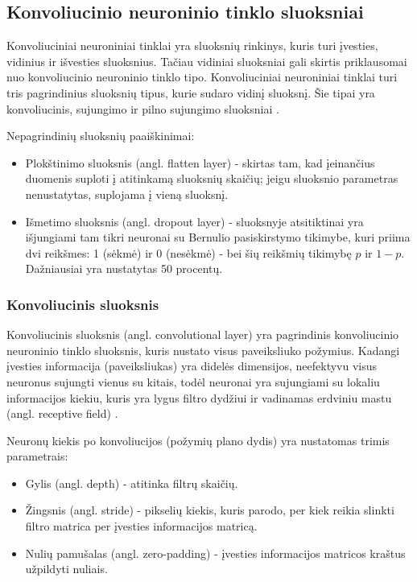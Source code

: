 \documentclass{VUMIFPSbakalaurinis}
\begin{document}
\subsection{Konvoliucinio neuroninio tinklo sluoksniai}
Konvoliuciniai neuroniniai tinklai yra sluoksnių rinkinys, kuris turi įvesties, vidinius ir išvesties sluoksnius. Tačiau vidiniai sluoksniai gali skirtis priklausomai 
nuo konvoliucinio neuroninio tinklo tipo. Konvoliuciniai neuroniniai tinklai turi tris pagrindinius 
sluoksnių tipus, kurie sudaro vidinį sluoksnį. Šie tipai yra konvoliucinis, sujungimo ir pilno sujungimo sluoksniai \cite{CNNbasic}.

Nepagrindinių sluoksnių paaiškinimai:
\begin{itemize}
\item Plokštinimo sluoksnis (angl. flatten layer) - skirtas tam, kad įeinančius duomenis suploti į atitinkamą sluoksnių skaičių; jeigu sluoksnio parametras nenustatytas, suplojama į vieną sluoksnį.
\item Išmetimo sluoksnis (angl. dropout layer) - sluoksnyje atsitiktinai yra išjungiami tam tikri neuronai su Bernulio pasiskirstymo tikimybe, kuri priima dvi reikšmes: 1 (sėkmė) ir 0 (nesėkmė) - 
bei šių reikšmių tikimybę \(p\) ir \(1 - p\). Dažniausiai yra nustatytas 50 procentų.
\end{itemize}

\subsubsection{Konvoliucinis sluoksnis}
Konvoliucinis sluoksnis (angl. convolutional layer) yra pagrindinis konvoliucinio neuroninio tinklo sluoksnis, kuris nustato visus paveiksliuko požymius.
Kadangi įvesties informacija (paveiksliukas) yra didelės dimensijos, neefektyvu visus neuronus sujungti vienus su kitais, todėl neuronai yra sujungiami
su lokaliu informacijos kiekiu, kuris yra lygus filtro dydžiui ir vadinamas erdviniu mastu (angl. receptive field) \cite{layers-CS231n}.

Neuronų kiekis po konvoliucijos (požymių plano dydis) yra nustatomas trimis parametrais:
\begin{itemize}
\item Gylis (angl. depth) - atitinka filtrų skaičių.
\item Žingsnis (angl. stride) - pikselių kiekis, kuris parodo, per kiek reikia slinkti filtro matrica per įvesties informacijos matricą.
\item Nulių pamušalas (angl. zero-padding) - įvesties informacijos matricos kraštus užpildyti nuliais.
\end{itemize}
\end{document}
